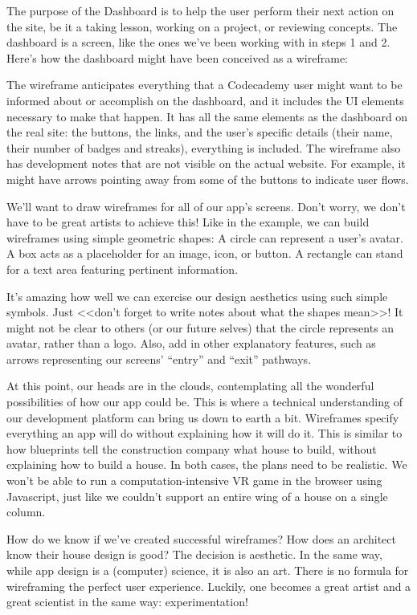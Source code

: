         The purpose of the Dashboard is to help the user perform their next action on the site, be it a taking lesson, working on a project, or reviewing concepts. The dashboard is a screen, like the ones we’ve been working with in steps 1 and 2. Here’s how the dashboard might have been conceived as a wireframe:

        The wireframe anticipates everything that a Codecademy user might want to be informed about or accomplish on the dashboard, and it includes the UI elements necessary to make that happen. It has all the same elements as the dashboard on the real site: the buttons, the links, and the user’s specific details (their name, their number of badges and streaks), everything is included. The wireframe also has development notes that are not visible on the actual website. For example, it might have arrows pointing away from some of the buttons to indicate user flows.

        We’ll want to draw wireframes for all of our app’s screens. Don’t worry, we don’t have to be great artists to achieve this! Like in the example, we can build wireframes using simple geometric shapes:
            A circle can represent a user’s avatar.
            A box acts as a placeholder for an image, icon, or button.
            A rectangle  can stand for a text area featuring pertinent information.
            
        It’s amazing how well we can exercise our design aesthetics using such simple symbols. Just <<don’t forget to write notes about what the shapes mean>>! It might not be clear to others (or our future selves) that the circle represents an avatar, rather than a logo. Also, add in other explanatory features, such as arrows representing our screens’ “entry” and “exit” pathways.

        At this point, our heads are in the clouds, contemplating all the wonderful possibilities of how our app could be. This is where a technical understanding of our development platform can bring us down to earth a bit. Wireframes specify everything an app will do without explaining how it will do it. This is similar to how blueprints tell the construction company what house to build, without explaining how to build a house. In both cases, the plans need to be realistic. We won’t be able to run a computation-intensive VR game in the browser using Javascript, just like we couldn’t support an entire wing of a house on a single column.

        How do we know if we’ve created successful wireframes? How does an architect know their house design is good? The decision is aesthetic. In the same way, while app design is a (computer) science, it is also an art. There is no formula for wireframing the perfect user experience. Luckily, one becomes a great artist and a great scientist in the same way: experimentation!

